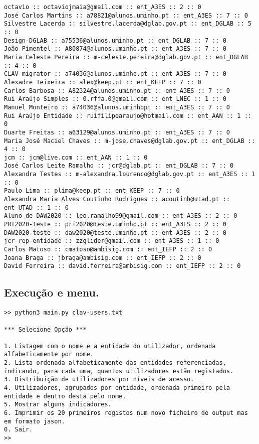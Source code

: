 \documentclass[11pt,a4paper]{report}%
\begin{document}
\begin{verbatim}
octavio :: octaviojmaia@gmail.com :: ent_A3ES :: 2 :: 0
José Carlos Martins :: a78821@alunos.uminho.pt :: ent_A3ES :: 7 :: 0
Silvestre Lacerda :: silvestre.lacerda@dglab.gov.pt :: ent_DGLAB :: 5 :: 0
Design-DGLAB :: a75536@alunos.uminho.pt :: ent_DGLAB :: 7 :: 0
João Pimentel :: A80874@alunos.uminho.pt :: ent_A3ES :: 7 :: 0
Maria Celeste Pereira :: m-celeste.pereira@dglab.gov.pt :: ent_DGLAB :: 4 :: 0
CLAV-migrator :: a74036@alunos.uminho.pt :: ent_A3ES :: 7 :: 0
Alexadre Teixeira :: alex@keep.pt :: ent_KEEP :: 7 :: 0
Carlos Barbosa :: A82324@alunos.uminho.pt :: ent_A3ES :: 7 :: 0
Rui Araújo Simples :: 0.rffa.0@gmail.com :: ent_LNEC :: 1 :: 0
Manuel Monteiro :: a74036@alunos.uminhopt :: ent_A3ES :: 7 :: 0
Rui Araújo Entidade :: ruifilipearaujo@hotmail.com :: ent_AAN :: 1 :: 0
Duarte Freitas :: a63129@alunos.uminho.pt :: ent_A3ES :: 7 :: 0
Maria José Maciel Chaves :: m-jose.chaves@dglab.gov.pt :: ent_DGLAB :: 4 :: 0
jcm :: jcm@live.com :: ent_AAN :: 1 :: 0
José Carlos Leite Ramalho :: jcr@dglab.pt :: ent_DGLAB :: 7 :: 0
Alexandra Testes :: m-alexandra.lourenco@dglab.gov.pt :: ent_A3ES :: 1 :: 0
Paulo Lima :: plima@keep.pt :: ent_KEEP :: 7 :: 0
Alexandra Maria Alves Coutinho Rodrigues :: acoutinh@utad.pt :: ent_UTAD :: 1 :: 0
Aluno de DAW2020 :: leo.ramalho99@gmail.com :: ent_A3ES :: 2 :: 0
PRI2020-teste :: pri2020@teste.uminho.pt :: ent_A3ES :: 2 :: 0
DAW2020-teste :: daw2020@teste.uminho.pt :: ent_A3ES :: 2 :: 0
jcr-rep-entidade :: zzglider@gmail.com :: ent_A3ES :: 1 :: 0
Carlos Matoso :: cmatoso@ambisig.com :: ent_IEFP :: 2 :: 0
Joana Braga :: jbraga@ambisig.com :: ent_IEFP :: 2 :: 0
David Ferreira :: david.ferreira@ambisig.com :: ent_IEFP :: 2 :: 0
\end{verbatim}


\subsection{Execução e menu.}
\begin{scriptsize}
\begin{verbatim}
>> python3 main.py clav-users.txt

*** Selecione Opção ***

1. Listagem com o nome e a entidade do utilizador, ordenada alfabeticamente por nome.
2. Lista ordenada alfabeticamente das entidades referenciadas, indicando, para cada uma, quantos utilizadores estão registados.
3. Distribuição de utilizadores por níveis de acesso.
4. Utilizadores, agrupados por entidade, ordenada primeiro pela entidade e dentro desta pelo nome.
5. Mostrar alguns indicadores.
6. Imprimir os 20 primeiros registos num novo ficheiro de output mas em formato jason.
0. Sair.
>> 
\end{verbatim}
\end{scriptsize}
\end{document}
